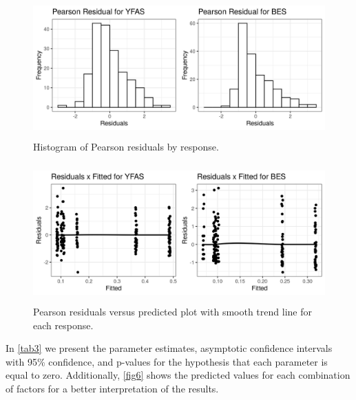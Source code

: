 \documentclass[Review,sagev,times, doublespace]{sagej}
\begin{document}
\begin{figure}[h]
\centering
\includegraphics[width=29.4pc,height=12.6pc]{FIGURE4.jpeg}
\caption{Histogram of Pearson residuals by response.\label{fig4}}
\end{figure}

\begin{figure}[h]
\centering
\includegraphics[width=29.4pc,height=12.6pc]{FIGURE5.jpeg}
\caption{Pearson residuals versus predicted plot with smooth trend line for each response.\label{fig5}}
\end{figure}

In \autoref{tab3} we present the parameter estimates, asymptotic confidence intervals with 95\% confidence, and p-values for the hypothesis that each parameter is equal to zero. Additionally, \autoref{fig6} shows the predicted values for each combination of factors for a better interpretation of the results.
\end{document}
